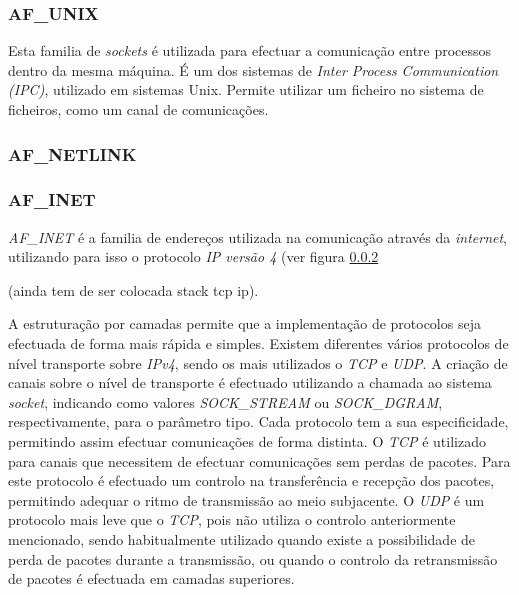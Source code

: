 
\subsubsection{AF\_UNIX}

Esta familia de \textit{sockets} é utilizada para efectuar a comunicação entre processos dentro da mesma máquina.
É um dos sistemas de \textit{Inter Process Communication (IPC)}, utilizado em sistemas Unix.
Permite utilizar um ficheiro no sistema de ficheiros, como um canal de comunicações.

\subsubsection{AF\_NETLINK}


\subsubsection{AF\_INET}
\label{subsub:af_inet}

\textit{AF\_INET} é a familia de endereços utilizada na comunicação através da \textit{internet}, utilizando para isso o protocolo \textit{IP versão 4} (ver figura \ref{}

 (ainda tem de ser colocada stack tcp ip).

A estruturação por camadas permite que a implementação de protocolos seja efectuada de forma mais rápida e simples.
Existem diferentes vários protocolos de nível transporte sobre \textit{IPv4}, sendo os mais utilizados o \textit{TCP} e \textit{UDP}.
A criação de canais sobre o nível de transporte é efectuado utilizando a chamada ao sistema \textit{socket}, indicando como valores \textit{SOCK\_STREAM} ou \textit{SOCK\_DGRAM}, respectivamente, para o parâmetro tipo.
Cada protocolo tem a sua especificidade, permitindo assim efectuar comunicações de forma distinta.
O \textit{TCP} é utilizado para canais que necessitem de efectuar comunicações sem perdas de pacotes.
Para este protocolo é efectuado um controlo na transferência e recepção dos pacotes, permitindo adequar o ritmo de transmissão ao meio subjacente.
O \textit{UDP} é um protocolo mais leve que o \textit{TCP}, pois não utiliza o controlo anteriormente mencionado, sendo habitualmente utilizado quando existe a possibilidade de perda de pacotes durante a transmissão, ou quando o controlo da retransmissão de pacotes é efectuada em camadas superiores.

